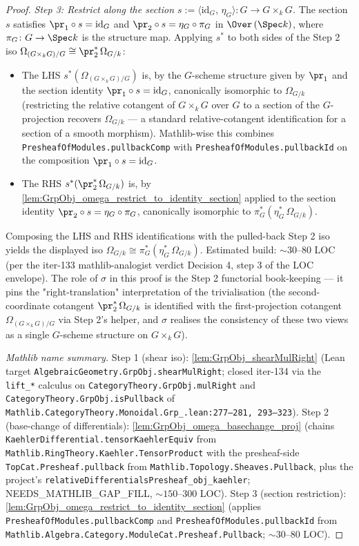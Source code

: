 \begin{proof}
  \emph{Step 3: Restrict along the section \(s := \langle \mathrm{id}_{G},\, \eta_{G} \rangle \colon G \to G \times_{k} G\).} The section \(s\) satisfies \(\pr_{1} \circ s = \mathrm{id}_{G}\) and \(\pr_{2} \circ s = \eta_{G} \circ \pi_{G}\) in \(\Over\,(\Spec k)\), where \(\pi_{G} \colon G \to \Spec k\) is the structure map. Applying \(s^{*}\) to both sides of the Step 2 iso \(\Omega_{(G \times_{k} G)/G} \cong \pr_{2}^{*}\,\Omega_{G/k}\):
  \begin{itemize}
    \item The LHS \(s^{*}(\Omega_{(G \times_{k} G)/G})\) is, by the \(G\)-scheme structure given by \(\pr_{1}\) and the section identity \(\pr_{1} \circ s = \mathrm{id}_{G}\), canonically isomorphic to \(\Omega_{G/k}\) (restricting the relative cotangent of \(G \times_{k} G\) over \(G\) to a section of the \(G\)-projection recovers \(\Omega_{G/k}\) — a standard relative-cotangent identification for a section of a smooth morphism). Mathlib-wise this combines \texttt{PresheafOfModules.pullbackComp} with \texttt{PresheafOfModules.pullbackId} on the composition \(\pr_{1} \circ s = \mathrm{id}_{G}\).
    \item The RHS \(s^{*}(\pr_{2}^{*}\,\Omega_{G/k})\) is, by \cref{lem:GrpObj_omega_restrict_to_identity_section} applied to the section identity \(\pr_{2} \circ s = \eta_{G} \circ \pi_{G}\), canonically isomorphic to \(\pi_{G}^{*}(\eta_{G}^{*}\,\Omega_{G/k})\).
  \end{itemize}
  Composing the LHS and RHS identifications with the pulled-back Step 2 iso yields the displayed iso \(\Omega_{G/k} \cong \pi_{G}^{*}(\eta_{G}^{*}\,\Omega_{G/k})\). Estimated build: \(\sim 30\)--\(80\) LOC (per the iter-133 mathlib-analogist verdict Decision 4, step 3 of the LOC envelope). The role of \(\sigma\) in this proof is the Step 2 functorial book-keeping — it pins the "right-translation" interpretation of the trivialisation (the second-coordinate cotangent \(\pr_{2}^{*}\,\Omega_{G/k}\) is identified with the first-projection cotangent \(\Omega_{(G \times_{k} G)/G}\) via Step 2's helper, and \(\sigma\) realises the consistency of these two views as a single \(G\)-scheme structure on \(G \times_{k} G\)).

  \emph{Mathlib name summary.} Step 1 (shear iso): \cref{lem:GrpObj_shearMulRight} (Lean target \texttt{AlgebraicGeometry.GrpObj.shearMulRight}; closed iter-134 via the \texttt{lift\_*} calculus on \texttt{CategoryTheory.GrpObj.mulRight} and \texttt{CategoryTheory.GrpObj.isPullback} of \texttt{Mathlib.CategoryTheory.Monoidal.Grp\_.lean:277--281,\,293--323}). Step 2 (base-change of differentials): \cref{lem:GrpObj_omega_basechange_proj} (chains \texttt{KaehlerDifferential.tensorKaehlerEquiv} from \texttt{Mathlib.RingTheory.Kaehler.TensorProduct} with the presheaf-side \texttt{TopCat.Presheaf.pullback} from \texttt{Mathlib.Topology.Sheaves.Pullback}, plus the project's \texttt{relativeDifferentialsPresheaf\_obj\_kaehler}; NEEDS\_MATHLIB\_GAP\_FILL, \(\sim 150\)--\(300\) LOC). Step 3 (section restriction): \cref{lem:GrpObj_omega_restrict_to_identity_section} (applies \texttt{PresheafOfModules.pullbackComp} and \texttt{PresheafOfModules.pullbackId} from \texttt{Mathlib.Algebra.Category.ModuleCat.Presheaf.Pullback}; \(\sim 30\)--\(80\) LOC).


\end{proof}
